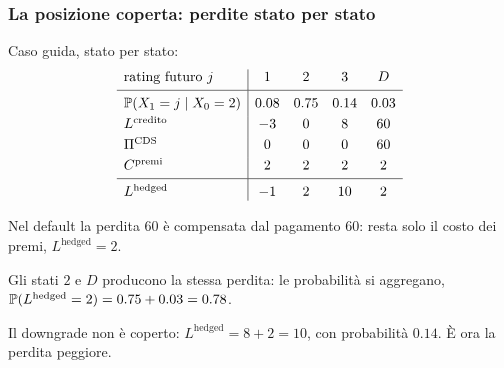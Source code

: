 \begin{frame}%
%

\frametitle{La posizione coperta: perdite stato per stato}%
%

%


Caso guida, stato per stato:
\[%
\begin{array}
[c]{l|cccc}%
\text{rating futuro }j & 1 & 2 & 3 & D\\[1mm]\hline
\rule{0pt}{2.8ex}\Prob(X_{1}=j\mid X_{0}=2) & 0.08 & 0.75 & 0.14 & 0.03\\[1mm]%
L^{\mathrm{credito}} & -3 & 0 & 8 & 60\\[1mm]%
\Pi^{\mathrm{CDS}} & 0 & 0 & 0 & 60\\[1mm]%
C^{\mathrm{premi}} & 2 & 2 & 2 & 2\\[1mm]\hline
\rule{0pt}{2.8ex}L^{\mathrm{hedged}} & -1 & 2 & 10 & 2
\end{array}
\]


\begin{stepitemize}
\item Nel default la perdita $60$ \`{e} compensata dal pagamento $60$: resta
solo il costo dei premi, $L^{\mathrm{hedged}}=2$.

\item Gli stati $2$ e $D$ producono la stessa perdita: le probabilit\`{a} si
aggregano, $\mathbb{P}(L^{\mathrm{hedged}}=2)=0.75+0.03=0.78$.

\item Il downgrade non \`{e} coperto: $L^{\mathrm{hedged}}=8+2=10$, con
probabilit\`{a} $0.14$. \`{E} ora la perdita peggiore.
\end{stepitemize}

%

\transboxout
\end{frame}%


%

